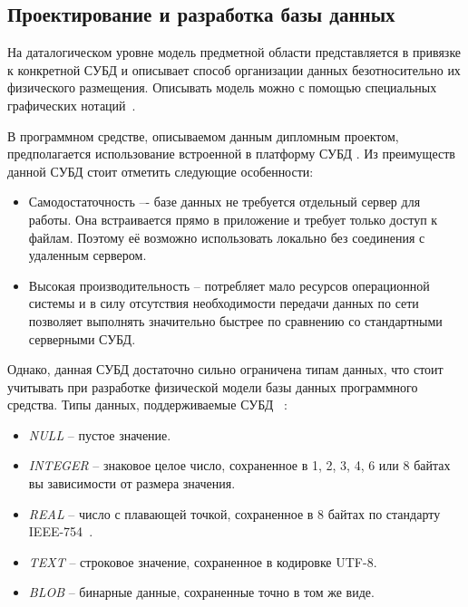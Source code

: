 \subsection{Проектирование и разработка базы данных}
\label{sec:design:database}


На даталогическом уровне модель предметной области представляется в привязке к конкретной СУБД и описывает способ организации данных безотносительно их физического размещения.
Описывать модель можно с помощью специальных графических нотаций~\cite{kulikov_db_workbook}.

В программном средстве, описываемом данным дипломным проектом, предполагается использование встроенной в платформу \andro СУБД \sqlite.
Из преимуществ данной СУБД стоит отметить следующие особенности:
\begin{itemize}
    \item Самодостаточность –- базе данных \sqlite не требуется отдельный сервер для работы.
    Она встраивается прямо в приложение и требует только доступ к файлам.
    Поэтому её возможно использовать локально без соединения с удаленным сервером.
    \item Высокая производительность – \sqlite потребляет мало ресурсов операционной системы и в силу отсутствия необходимости передачи данных по сети позволяет выполнять значительно быстрее по сравнению со стандартными серверными СУБД.
\end{itemize}

Однако, данная СУБД достаточно сильно ограничена типам данных, что стоит учитывать при разработке физической модели базы данных программного средства.
Типы данных, поддерживаемые СУБД \sqlite~\cite{sqlite_types}:
\begin{itemize}
    \item \emph{NULL} -- пустое значение.
    \item \emph{INTEGER} -- знаковое целое число, сохраненное в 1, 2, 3, 4, 6 или 8 байтах вы зависимости от размера значения.
    \item \emph{REAL} -- число с плавающей точкой, сохраненное в 8 байтах по стандарту IEEE-754~\cite{ieee_754}.
    \item \emph{TEXT} -- строковое значение, сохраненное в кодировке UTF-8.
    \item \emph{BLOB} -- бинарные данные, сохраненные точно в том же виде.
\end{itemize}

